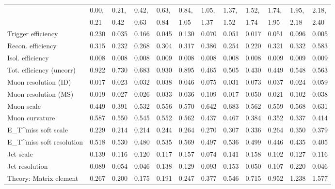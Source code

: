\begin{tabular}{l|p{0.6cm}p{0.6cm}p{0.6cm}p{0.6cm}p{0.6cm}p{0.6cm}p{0.6cm}p{0.6cm}p{0.6cm}p{0.6cm}p{0.6cm}}
\hline
   & 0.00, & 0.21, & 0.42, & 0.63, & 0.84, & 1.05, & 1.37, & 1.52, & 1.74, & 1.95, & 2.18,  \\ 
   & 0.21 & 0.42 & 0.63 & 0.84 & 1.05 & 1.37 & 1.52 & 1.74 & 1.95 & 2.18 & 2.40  \\ 
\hline
Trigger efficiency                       & 0.230 & 0.035 & 0.166 & 0.045 & 0.130 & 0.070 & 0.051 & 0.017 & 0.051 & 0.096 & 0.005 \\
Recon. efficiency                        & 0.315 & 0.232 & 0.268 & 0.304 & 0.317 & 0.386 & 0.254 & 0.220 & 0.321 & 0.332 & 0.583 \\
Isol. efficiency                         & 0.008 & 0.008 & 0.008 & 0.009 & 0.008 & 0.008 & 0.008 & 0.008 & 0.009 & 0.009 & 0.009 \\
Tot. efficiency (uncorr)                 & 0.922 & 0.730 & 0.683 & 0.930 & 0.895 & 0.465 & 0.505 & 0.430 & 0.449 & 0.548 & 0.563 \\
Muon resolution (ID)                     & 0.017 & 0.023 & 0.032 & 0.038 & 0.046 & 0.075 & 0.031 & 0.073 & 0.037 & 0.024 & 0.059 \\
Muon resolution (MS)                     & 0.019 & 0.027 & 0.026 & 0.033 & 0.036 & 0.109 & 0.017 & 0.050 & 0.021 & 0.102 & 0.038 \\
Muon scale                               & 0.449 & 0.391 & 0.532 & 0.556 & 0.570 & 0.642 & 0.683 & 0.562 & 0.559 & 0.568 & 0.631 \\
Muon curvature                           & 0.587 & 0.550 & 0.545 & 0.552 & 0.562 & 0.437 & 0.467 & 0.384 & 0.352 & 0.337 & 0.414 \\
E_{T}^{miss} soft scale                  & 0.229 & 0.214 & 0.214 & 0.244 & 0.264 & 0.270 & 0.307 & 0.336 & 0.264 & 0.350 & 0.379 \\
E_{T}^{miss} soft resolution             & 0.518 & 0.530 & 0.480 & 0.535 & 0.569 & 0.497 & 0.536 & 0.499 & 0.446 & 0.435 & 0.405 \\
Jet scale                                & 0.139 & 0.116 & 0.120 & 0.117 & 0.157 & 0.074 & 0.141 & 0.158 & 0.102 & 0.127 & 0.116 \\
Jet resolution                           & 0.089 & 0.054 & 0.046 & 0.138 & 0.129 & 0.093 & 0.153 & 0.050 & 0.107 & 0.220 & 0.046 \\
Theory: Matrix element                   & 0.267 & 0.200 & 0.175 & 0.191 & 0.247 & 0.377 & 0.546 & 0.715 & 0.952 & 1.238 & 1.577 \\

\end{tabular}
